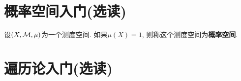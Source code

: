 \section{概率空间入门(选读)}
设$(X,\mathcal{M}, \mu)$为一个测度空间. 如果$\mu(X) = 1$, 则称这个测度空间为\textbf{概率空间}. 



\section{遍历论入门(选读)}